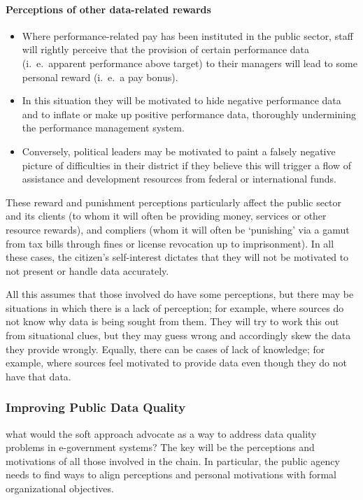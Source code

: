\paragraph*{Perceptions of other data-related rewards}
\begin{itemize}
	\item Where performance-related pay has been instituted in the public sector, staff will rightly perceive that the provision of certain performance data (i.\ e.\ apparent performance above target) to their managers will lead to some personal reward (i.\ e.\ a pay bonus). 
	
	\item In this situation they will be motivated to hide negative performance data and to inflate or make up positive performance data, thoroughly undermining the performance management system. 
	
	\item Conversely, political leaders may be motivated to paint a falsely negative picture of difficulties in their district if they believe this will trigger a flow of assistance and development resources from federal or international funds.
\end{itemize}


\noindent These reward and punishment perceptions particularly affect the public sector and its clients (to whom it will often be providing money, services or other resource rewards), and compliers (whom it will often be `punishing' via a gamut from tax bills through fines or license revocation up to imprisonment). In all these cases, the citizen’s self-interest dictates that they will not be motivated to not present or handle data accurately.


All this assumes that those involved do have some perceptions, but there may be situations in which there is a lack of perception; for example, where sources do not know why data is being sought from them. They will try to work this out from situational clues, but they may guess wrong and accordingly skew the data they provide wrongly. Equally, there can be cases of lack of knowledge; for example, where sources feel motivated to provide data even though they do not have that data.


\subsubsection{Improving Public Data Quality}
what would the soft approach advocate as a way to address data quality problems in e-government systems? The key will be the perceptions and motivations of all those
involved in the chain. In particular, the public agency needs to find ways to align perceptions and personal motivations with formal organizational objectives.

